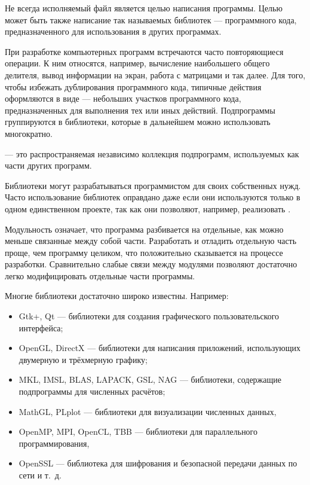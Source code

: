 Не всегда исполняемый файл является целью написания программы. Целью
может быть также написание так называемых библиотек — программного
кода, предназначенного для использования в других программах.

При разработке компьютерных программ встречаются часто повторяющиеся
операции. К ним относятся, например, вычисление наибольшего общего
делителя, вывод информации на экран, работа с матрицами и так далее.
Для того, чтобы избежать дублирования программного кода, типичные
действия оформляются в виде  —
небольших участков программного кода, предназначенных для выполнения
тех или иных действий.  Подпрограммы группируются в библиотеки,
которые в дальнейшем можно использовать многократно.

\begin{defn}
   — это распространяемая независимо
  коллекция подпрограмм, используемых как части других программ.
\end{defn}

Библиотеки могут разрабатываться программистом для своих собственных
нужд. Часто использование библиотек оправдано даже если они
используются только в одном единственном проекте, так как они
позволяют, например, реализовать .

Модульность означает, что программа разбивается на отдельные, как
можно меньше связанные между собой части. Разработать и отладить
отдельную часть проще, чем программу целиком, что положительно
сказывается на процессе разработки. Сравнительно слабые связи между
модулями позволяют достаточно легко модифицировать отдельные части
программы.

Многие библиотеки достаточно широко известны. Например:
\begin{itemize}
\item Gtk+, Qt — библиотеки для создания графического
  пользовательского интерфейса;
\item OpenGL, DirectX — библиотеки для написания приложений,
  использующих двумерную и трёхмерную графику;
\item MKL, IMSL, BLAS, LAPACK, GSL, NAG — библиотеки, содержащие
  подпрограммы для численных расчётов;
\item MathGL, PLplot — библиотеки для визуализации численных данных,
\item OpenMP, MPI, OpenCL, TBB — библиотеки для параллельного
  программирования,
\item OpenSSL — библиотека для шифрования и безопасной передачи данных
  по сети и т.~д.
\end{itemize}

